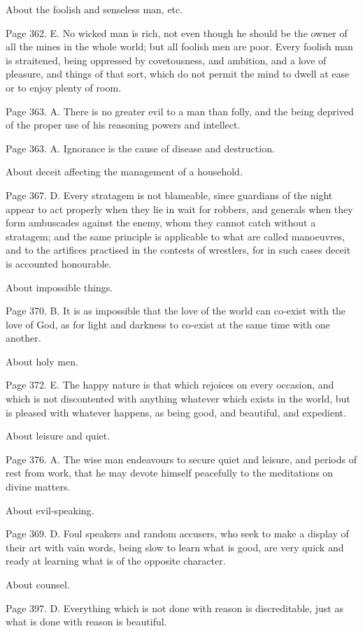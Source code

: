 About the foolish and senseless man, etc.

Page 362. E. No wicked man is rich, not even though he should be the owner of all the mines in the
whole world; but all foolish men are poor. Every foolish man is straitened, being oppressed by
covetousness, and ambition, and a love of pleasure, and things of that sort, which do not permit the
mind to dwell at ease or to enjoy plenty of room.

Page 363. A. There is no greater evil to a man than folly, and the being deprived of the proper use
of his reasoning powers and intellect.

Page 363. A. Ignorance is the cause of disease and destruction.

About deceit affecting the management of a household.

Page 367. D. Every stratagem is not blameable, since guardians of the night appear to act
properly when they lie in wait for robbers, and generals when they form ambuscades against the
enemy, whom they cannot catch without a stratagem; and the same principle is applicable to what
are called manoeuvres, and to the artifices practised in the contests of wrestlers, for in such
cases deceit is accounted honourable.

About impossible things.

Page 370. B. It is as impossible that the love of the world can co-exist with the love of God, as for
light and darkness to co-exist at the same time with one another.

About holy men.

Page 372. E. The happy nature is that which rejoices on every occasion, and which is not
discontented with anything whatever which exists in the world, but is pleased with whatever
happens, as being good, and beautiful, and expedient.

About leisure and quiet.

Page 376. A. The wise man endeavours to secure quiet and leisure, and periods of rest from work,
that he may devote himself peacefully to the meditations on divine matters.

About evil-speaking.

Page 369. D. Foul speakers and random accusers, who seek to make a display of their art with
vain words, being slow to learn what is good, are very quick and ready at learning what is of the
opposite character.

About counsel.

Page 397. D. Everything which is not done with reason is discreditable, just as what is done with
reason is beautiful.

